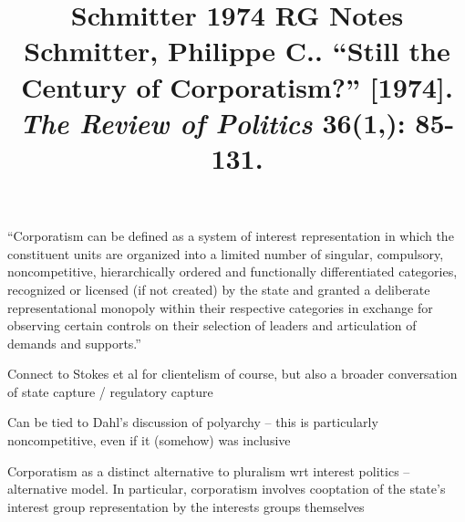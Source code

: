 \documentclass[12pt]{article}
\title{\textbf{Schmitter 1974 RG Notes}\\
\large Schmitter, Philippe C.. ``Still the Century of Corporatism?'' [1974].\\
\textit{The Review of Politics} 36(1,): 85-131.}
\author{}
\date{}
\begin{document}
\maketitle

``Corporatism can be defined as a system of interest representation in which the constituent units are organized into a limited number of singular, compulsory, noncompetitive, hierarchically ordered and functionally differentiated categories, recognized or licensed (if not created) by the state and granted a deliberate representational monopoly within their respective categories in exchange for observing certain controls on their selection of leaders and articulation of demands and supports.''

Connect to Stokes et al for clientelism of course, but also a broader conversation of state capture / regulatory capture

Can be tied to Dahl's discussion of polyarchy -- this is particularly noncompetitive, even if it (somehow) was inclusive

Corporatism as a distinct alternative to pluralism wrt interest politics -- alternative model. In particular, corporatism involves cooptation of the state's interest group representation by the interests groups themselves
\end{document}
